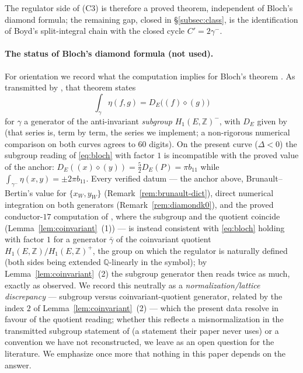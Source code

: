 \documentclass[11pt]{amsart}
\theoremstyle{definition}
\theoremstyle{remark}
\newcommand{\Q}{\mathbb{Q}}
\newcommand{\Z}{\mathbb{Z}}
\begin{document}
The regulator side of (C3) is therefore a proved theorem, independent of
Bloch's diamond formula; the remaining gap, closed in \S\ref{subsec:class},
is the identification of Boyd's split-integral chain with the closed cycle
$C'=2\gamma^-$.

\paragraph{The status of Bloch's diamond formula (not used).}
For orientation we record what the computation implies for Bloch's theorem
\cite{Bloch}.
As transmitted by \cite[Thm.~6]{LalinRam}, that theorem states
\begin{equation}\label{eq:bloch}
  \int_{\gamma}\eta(f,g)
  =D_E\big((f)\diamond(g)\big)
\end{equation}
for $\gamma$ a generator of the anti-invariant \emph{subgroup}
$H_1(E,\Z)^-$, with $D_E$ given by \cite[Def.~5, eq.~(10)]{LalinRam} (that
series is, term by term, the series we implement; a non-rigorous numerical
comparison on both curves agrees to $60$ digits).  On the present curve
($\Delta<0$) the subgroup reading of \eqref{eq:bloch} with factor $1$ is
incompatible with the proved value of the anchor:
$D_E((x)\diamond(y))=\frac52D_E(P)=\pi b_{11}$ while
$\int_{\gamma^-}\eta(x,y)=\pm2\pi b_{11}$.  Every verified datum --- the
anchor above, Brunault--Bertin's value for $\{x_W,y_W\}$
(Remark~\ref{rem:brunault-dict}), direct numerical integration on both
generators (Remark~\ref{rem:diamondk0}), and the proved conductor-$17$
computation of \cite{LalinRam}, where the subgroup and the quotient
coincide (Lemma~\ref{lem:coinvariant}~(1)) --- is instead consistent with
\eqref{eq:bloch} holding with factor $1$ for a generator $\bar\gamma$ of
the coinvariant quotient $H_1(E,\Z)/H_1(E,\Z)^+$, the group on which the
regulator is naturally defined (both sides being extended $\Q$-linearly in
the symbol); by Lemma~\ref{lem:coinvariant}~(2) the subgroup generator then
reads twice as much, exactly as observed.  We record this neutrally as a
\emph{normalization/lattice discrepancy} --- subgroup versus
coinvariant-quotient generator, related by the index $2$ of
Lemma~\ref{lem:coinvariant}~(2) --- which the present data resolve in
favour of the quotient reading; whether this reflects a misnormalization
in the transmitted subgroup statement of \cite[Thm.~6]{LalinRam} (a
statement their paper never uses) or a convention we have not
reconstructed, we leave as an open question for the literature.  We
emphasize once more that nothing in this paper depends on the answer.
\end{document}
